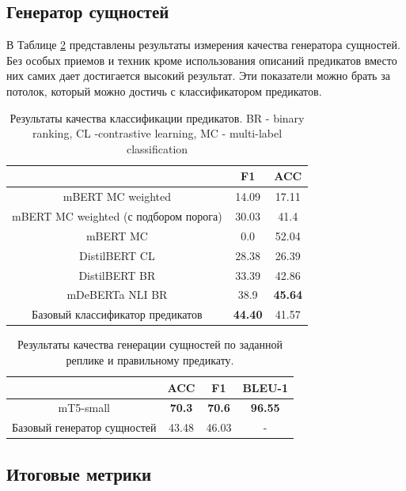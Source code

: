 \subsection{Генератор сущностей}
В Таблице \ref{table:egen_results} представлены результаты измерения качества генератора сущностей. Без особых приемов и техник кроме использования описаний предикатов вместо них самих дает достигается высокий результат. Эти показатели можно брать за потолок, который можно достичь с классификатором предикатов.

\begin{table}[!ht]
\centering
\begin{tabular}{c c c}
    & \textbf{F1} & \textbf{ACC} \\
    \hline
    \hline
    mBERT MC weighted & 14.09 & 17.11 \\
    \hline
    mBERT MC weighted (с подбором порога) & 30.03 & 41.4 \\
    \hline
    mBERT MC & 0.0 & 52.04 \\
    \hline
    DistilBERT CL & 28.38 & 26.39 \\
    \hline
    DistilBERT BR & 33.39 & 42.86 \\
    \hline
    mDeBERTa NLI BR & 38.9 & \textbf{45.64} \\
    \hline
    Базовый классификатор предикатов & \textbf{44.40} & 41.57 \\
    \hline
\end{tabular}
\caption{Результаты качества классификации предикатов. BR - binary ranking, CL -contrastive learning, MC - multi-label classification}
\label{table:rel_cls_results}
\end{table}

\begin{table}[!ht]
\centering
\begin{tabular}{c c c c}
    & \textbf{ACC} & \textbf{F1} & \textbf{BLEU-1} \\
    \hline
    \hline
    mT5-small & \textbf{70.3} & \textbf{70.6} & \textbf{96.55} \\
    \hline
    Базовый генератор сущностей & 43.48 & 46.03 & - \\
    \hline
\end{tabular}
\caption{Результаты качества генерации сущностей по заданной реплике и правильному предикату.}
\label{table:egen_results}
\end{table}

\subsection{Итоговые метрики}

